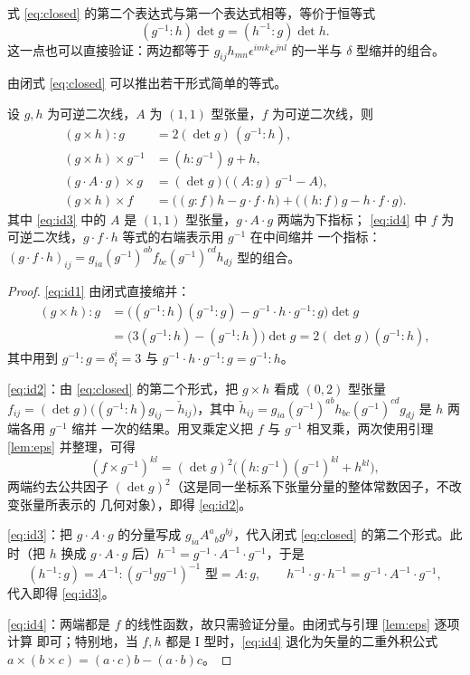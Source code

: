 \begin{remark}
式 \eqref{eq:closed} 的第二个表达式与第一个表达式相等，等价于恒等式
\[
(g^{-1}:h)\det g=(h^{-1}:g)\det h .
\]
这一点也可以直接验证：两边都等于 $g_{ij}h_{mn}\epsilon^{imk}\epsilon^{jnl}$ 的一半与
$\delta$ 型缩并的组合。
\end{remark}

由闭式 \eqref{eq:closed} 可以推出若干形式简单的等式。

\begin{proposition}
\label{prop:identities}
设 $g,h$ 为可逆二次线，$A$ 为 $(1,1)$ 型张量，$f$ 为可逆二次线，则
\begin{align}
(g\times h):g&=2(\det g)\,(g^{-1}:h), \label{eq:id1}\\
(g\times h)\times g^{-1}&=(h:g^{-1})\,g+h, \label{eq:id2}\\
(g\cdot A\cdot g)\times g&=(\det g)\big((A:g)\,g^{-1}-A\big), \label{eq:id3}\\
(g\times h)\times f&=\big((g:f)h-g\cdot f\cdot h\big)+\big((h:f)g-h\cdot f\cdot g\big).
\label{eq:id4}
\end{align}
其中 \eqref{eq:id3} 中的 $A$ 是 $(1,1)$ 型张量，$g\cdot A\cdot g$ 两端为下指标；
\eqref{eq:id4} 中 $f$ 为可逆二次线，$g\cdot f\cdot h$ 等式的右端表示用 $g^{-1}$ 在中间缩并
一个指标：$(g\cdot f\cdot h)_{ij}=g_{ia}(g^{-1})^{ab}f_{bc}(g^{-1})^{cd}h_{dj}$ 型的组合。
\end{proposition}

\begin{proof}
\eqref{eq:id1} 由闭式直接缩并：
\begin{align*}
(g\times h):g
&=\Big((g^{-1}:h)(g^{-1}:g)-g^{-1}\cdot h\cdot g^{-1}:g\Big)\det g\\
&=\big(3(g^{-1}:h)-(g^{-1}:h)\big)\det g
=2(\det g)(g^{-1}:h),
\end{align*}
其中用到 $g^{-1}:g=\delta^i_i=3$ 与 $g^{-1}\cdot h\cdot g^{-1}:g=g^{-1}:h$。

\eqref{eq:id2}：由 \eqref{eq:closed} 的第二个形式，把 $g\times h$ 看成 $(0,2)$ 型张量
$f_{ij}=(\det g)\big((g^{-1}:h)g_{ij}-\check h_{ij}\big)$，其中
$\check h_{ij}=g_{ia}(g^{-1})^{ab}h_{bc}(g^{-1})^{cd}g_{dj}$ 是 $h$ 两端各用 $g^{-1}$ 缩并
一次的结果。用叉乘定义把 $f$ 与 $g^{-1}$ 相叉乘，两次使用引理 \ref{lem:eps} 并整理，可得
\[
(f\times g^{-1})^{kl}=(\det g)^2\big((h:g^{-1})(g^{-1})^{kl}+h^{kl}\big),
\]
两端约去公共因子 $(\det g)^2$（这是同一坐标系下张量分量的整体常数因子，不改变张量所表示的
几何对象），即得 \eqref{eq:id2}。

\eqref{eq:id3}：把 $g\cdot A\cdot g$ 的分量写成 $g_{ia}A^a{}_b g^{bj}$，代入闭式
\eqref{eq:closed} 的第二个形式。此时（把 $h$ 换成 $g\cdot A\cdot g$ 后）$h^{-1}=g^{-1}\cdot
A^{-1}\cdot g^{-1}$，于是
\[
(h^{-1}:g)=A^{-1}:(g^{-1}gg^{-1})^{-1}\text{ 型}=A:g,\qquad
h^{-1}\cdot g\cdot h^{-1}=g^{-1}\cdot A^{-1}\cdot g^{-1} ,
\]
代入即得 \eqref{eq:id3}。

\eqref{eq:id4}：两端都是 $f$ 的线性函数，故只需验证分量。由闭式与引理 \ref{lem:eps} 逐项计算
即可；特别地，当 $f,h$ 都是 I 型时，\eqref{eq:id4} 退化为矢量的二重外积公式
$a\times(b\times c)=(a\cdot c)b-(a\cdot b)c$。
\end{proof}

